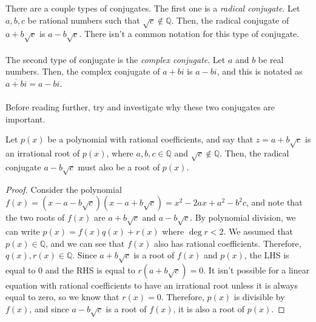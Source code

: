 \documentclass[12pt]{article}
\begin{document}
\begin{tcolorbox}[breakable, colback=red!10!white, colframe=red!50!black, title= Definition of Conjugates]
    There are a couple types of conjugates. The first one is a \textit{radical conjugate}. Let $a,b,c$ be rational numbers such that $\sqrt{c}\not\in\mathbb{Q}$. Then, the radical conjugate of $a+b\sqrt{c}$ is $a-b\sqrt{c}$. There isn't a common notation for this type of conjugate. \\\\
    The second type of conjugate is the \textit{complex conjugate}. Let $a$ and $b$ be real numbers. Then, the complex conjugate of $a+bi$ is $a-bi$, and this is notated as $\overline{a+bi}=a-bi$. \\\\
    Before reading further, try and investigate why these two conjugates are important.
\end{tcolorbox}
\begin{tcolorbox}[breakable, colback=blue!10!white, colframe=blue!50!black, title= Irrational Roots of Polynomials in $\mathbb{Q}$: Radical Conjugate Roots Theorem]
    Let $p(x)$ be a polynomial with rational coefficients, and say that $z=a+b\sqrt{c}$ is an irrational root of $p(x)$, where $a,b,c\in\mathbb{Q}$ and $\sqrt{c}\not\in\mathbb{Q}$. Then, the radical conjugate $a-b\sqrt{c}$ must also be a root of $p(x)$. 
    \begin{proof}
        Consider the polynomial $f(x)=(x-a-b\sqrt{c})(x-a+b\sqrt{c})=x^2-2ax+a^2-b^2c$, and note that the two roots of $f(x)$ are $a+b\sqrt{c}$ and $a-b\sqrt{c}$. By polynomial division, we can write $p(x)=f(x)q(x)+r(x)$ where $\deg r<2$. We assumed that $p(x)\in\mathbb{Q}$, and we can see that $f(x)$ also has rational coefficients. Therefore, $q(x),r(x)\in\mathbb{Q}$. Since $a+b\sqrt{c}$ is a root of $f(x)$ and $p(x)$, the LHS is equal to $0$ and the RHS is equal to $r(a+b\sqrt{c})=0$. It isn't possible for a linear equation with rational coefficients to have an irrational root unless it is always equal to zero, so we know that $r(x)=0$. Therefore, $p(x)$ is divisible by $f(x)$, and since $a-b\sqrt{c}$ is a root of $f(x)$, it is also a root of $p(x)$.
    \end{proof}
\end{tcolorbox}
\end{document}

